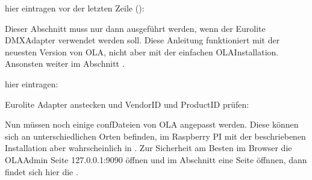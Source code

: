 \documentclass[letterpaper,10pt,ngerman]{sphinxmanual}
\begin{document}
hier eintragen vor der letzten Zeile ():



Dieser Abschnitt muss nur dann ausgeführt werden, wenn der Eurolite DMX\sphinxhyphen{}Adapter
verwendet werden soll. Diese Anleitung funktioniert mit der neuesten Version
von OLA, nicht aber mit der einfachen OLA\sphinxhyphen{}Installation.
Ansonsten weiter im
Abschnitt .


hier eintragen:


Eurolite Adapter anstecken und Vendor\sphinxhyphen{}ID und Product\sphinxhyphen{}ID prüfen:

\begin{sphinxVerbatim}[commandchars=\\\{\}]
  
  
   
\end{sphinxVerbatim}

Nun müssen noch einige conf\sphinxhyphen{}Dateien von OLA angepasst werden. Diese können sich
an unterschiedlichen Orten befinden, im Raspberry PI mit der beschriebenen
Installation aber wahrscheinlich in .
Zur Sicherheit am Besten im Browser die
OLA\sphinxhyphen{}Admin Seite 127.0.0.1:9090 öffnen und im Abschnitt  eine Seite
öffnnen, dann findet sich hier die .
\end{document}
